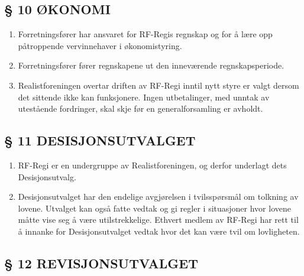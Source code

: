 \documentclass[a4paper,11pt,norsk]{scrartcl}
\begin{document}
\subsection{§ 10 ØKONOMI%
  \label{okonomi}%
}

\begin{enumerate}
\renewcommand{\labelenumi}{\alph{enumi})}
\item Forretningsfører har ansvaret for RF-Regis regnskap og for
å lære opp påtroppende vervinnehaver i økonomistyring.

\item Forretningsfører fører regnskapene ut den inneværende regnskapsperiode.

\item Realistforeningen overtar driften av RF-Regi inntil nytt
styre er valgt dersom det sittende ikke kan funksjonere. Ingen
utbetalinger, med unntak av utestående fordringer, skal skje før en
generalforsamling er avholdt.
\end{enumerate}


\subsection{§ 11 DESISJONSUTVALGET%
  \label{desisjonsutvalget}%
}

\begin{enumerate}
\renewcommand{\labelenumi}{\alph{enumi})}
\item RF-Regi er en undergruppe av Realistforeningen, og derfor underlagt dets
Desisjonsutvalg.

\item Desisjonsutvalget har den endelige avgjørelsen i tvilsspørsmål om
tolkning av lovene. Utvalget kan også fatte vedtak og gi regler i
situasjoner hvor lovene måtte vise seg å være utilstrekkelige.
Ethvert medlem av RF-Regi har rett til å innanke for
Desisjonsutvalget vedtak hvor det kan være tvil om lovligheten.
\end{enumerate}


\subsection{§ 12 REVISJONSUTVALGET%
  \label{revisjonsutvalget}%
}
\end{document}
